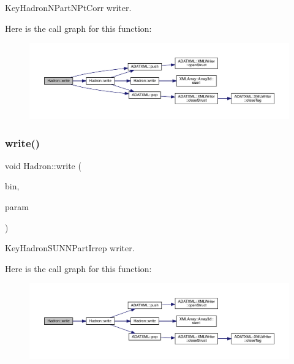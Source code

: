 Key\+Hadron\+N\+Part\+N\+Pt\+Corr writer. 

Here is the call graph for this function\+:
\nopagebreak
\begin{figure}[H]
\begin{center}
\leavevmode
\includegraphics[width=350pt]{d1/daf/namespaceHadron_a295fddb7420012571f5b8115f2b25a97_cgraph}
\end{center}
\end{figure}
\mbox{\label{namespaceHadron_a5a34021fb508d068cf35d125eef2e1b4}} 
\subsubsection{\texorpdfstring{write()}{write()}\hspace{0.1cm}{\footnotesize\ttfamily [32/95]}}
{\footnotesize\ttfamily void Hadron\+::write (\begin{DoxyParamCaption}\item[{\mbox{\hyperlink{classADATIO_1_1BinaryWriter}{Binary\+Writer}} \&}]{bin,  }\item[{const \mbox{\hyperlink{structHadron_1_1KeyHadronSUNNPartIrrep__t}{Key\+Hadron\+S\+U\+N\+N\+Part\+Irrep\+\_\+t}} \&}]{param }\end{DoxyParamCaption})}



Key\+Hadron\+S\+U\+N\+N\+Part\+Irrep writer. 

Here is the call graph for this function\+:
\nopagebreak
\begin{figure}[H]
\begin{center}
\leavevmode
\includegraphics[width=350pt]{d1/daf/namespaceHadron_a5a34021fb508d068cf35d125eef2e1b4_cgraph}
\end{center}
\end{figure}
\mbox{\label{namespaceHadron_a67dc2040c75fb33a942bc5a59243c4c3}} 
